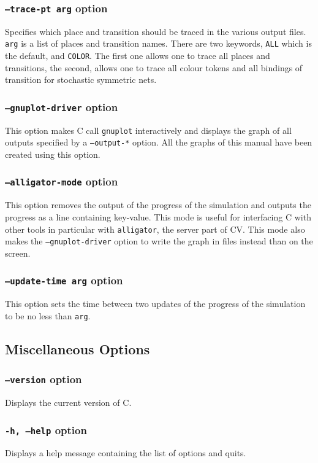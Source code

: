 \documentclass{article}
\newcommand{\cosmos}{\mbox{\textup{C}\scalebox{0.75}{{\textsc{OSMOS}}}}}
\newcommand{\cosyverif}{\mbox{\textup{C}\scalebox{0.75}{{\textsc{OSY}}}\textup{V}\scalebox{0.75}{{\textsc{ERIF}}}}}
\begin{document}
\subsubsection{\texttt{--trace-pt arg} option}
Specifies which place and transition should be traced in the various
output files.  \texttt{arg} is a list of places and transition
names. There are two keywords, \texttt{ALL} which is the default, and
\texttt{COLOR}. The first one allows one to trace all places and transitions,
the second, allows one to trace all colour tokens and all bindings of
transition for stochastic symmetric nets.

\subsubsection{\texttt{--gnuplot-driver} option}
This option makes \cosmos{} call \texttt{gnuplot} interactively and
displays the graph of all outputs specified by a \texttt{--output-*}
option.  All the graphs of this manual have been created using this
option.

\subsubsection{\texttt{--alligator-mode} option}
This option removes the output of the progress of the simulation 
and outputs the progress as a line containing key-value. This mode
is useful for interfacing \cosmos{} with other tools in particular 
with \texttt{alligator}, the server part of \cosyverif. This 
mode also makes the \texttt{--gnuplot-driver} option to write
the graph in files instead than on the screen.

\subsubsection{\texttt{--update-time arg} option}
This option sets the time between two updates of the progress of the simulation
to be no less than \texttt{arg}.

\subsection{Miscellaneous Options}
\subsubsection{\texttt{--version} option}
Displays the current version of \cosmos{}.

\subsubsection{\texttt{-h, --help} option}
Displays a help message containing the list of options and quits.
\end{document}
